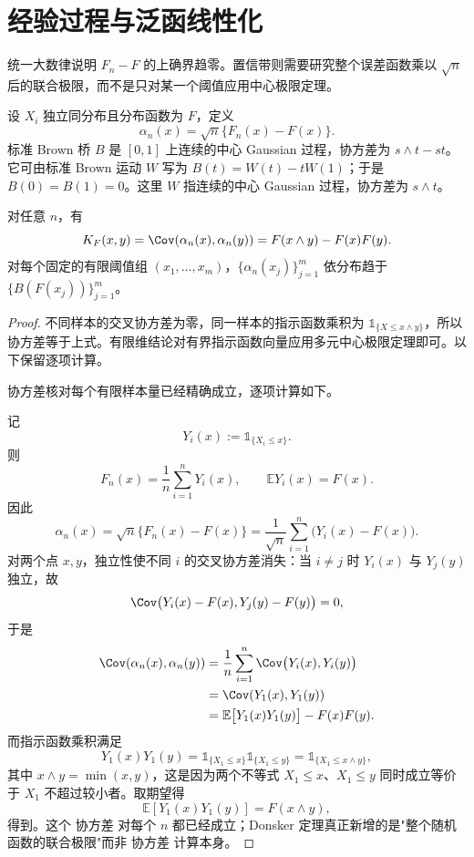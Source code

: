\section{经验过程与泛函线性化}

统一大数律说明 $F_n-F$ 的上确界趋零。置信带则需要研究整个误差函数乘以 $\sqrt n$ 后的联合极限，而不是只对某一个阈值应用中心极限定理。

\begin{definition}
设 $X_i$ 独立同分布且分布函数为 $F$，定义
\[
 \alpha_n(x)=\sqrt n\{F_n(x)-F(x)\}.
\]
标准 Brown 桥 $B$ 是 $[0,1]$ 上连续的中心 Gaussian 过程，协方差为 $s\wedge t-st$。它可由标准 Brown 运动 $W$ 写为 $B(t)=W(t)-tW(1)$；于是 $B(0)=B(1)=0$。这里 $W$ 指连续的中心 Gaussian 过程，协方差为 $s\wedge t$。
\end{definition}

\begin{proposition}[经验过程的精确协方差与有限维极限]
对任意 $n$，有
\begin{equation}\label{eq:math-stat-brownian-bridge-covariance}
 K_F(x,y)=\Cov(\alpha_n(x),\alpha_n(y))
 =F(x\wedge y)-F(x)F(y).
\end{equation}
对每个固定的有限阈值组 $(x_1,\ldots,x_m)$，$\{\alpha_n(x_j)\}_{j=1}^m$ 依分布趋于 $\{B(F(x_j))\}_{j=1}^m$。
\end{proposition}
\begin{proof}
不同样本的交叉协方差为零，同一样本的指示函数乘积为 $\mathds{1}_{\{X\le x\wedge y\}}$，所以协方差等于上式。有限维结论对有界指示函数向量应用多元中心极限定理即可。以下保留逐项计算。

协方差核对每个有限样本量已经精确成立，逐项计算如下。

记
\[
Y_i(x):=\mathds{1}_{\{X_i\le x\}}.
\]
则
\[
F_n(x)=\frac1n\sum_{i=1}^nY_i(x),
\qquad
\mathbb E Y_i(x)=F(x).
\]
因此
\[
\alpha_n(x)
=\sqrt n\{F_n(x)-F(x)\}
=\frac1{\sqrt n}\sum_{i=1}^n
\bigl(Y_i(x)-F(x)\bigr).
\]
对两个点 $x,y$，独立性使不同 $i$ 的交叉协方差消失：当 $i\neq j$ 时 $Y_i(x)$ 与 $Y_j(y)$ 独立，故
\[
\Cov\bigl(Y_i(x)-F(x),Y_j(y)-F(y)\bigr)=0,
\]
于是
\[
\begin{aligned}
\Cov(\alpha_n(x),\alpha_n(y))
&=\frac1n\sum_{i=1}^n\Cov\bigl(Y_i(x),Y_i(y)\bigr)\\
&=\Cov(Y_1(x),Y_1(y))\\
&=\mathbb E\bigl[Y_1(x)Y_1(y)\bigr]-F(x)F(y).
\end{aligned}
\]
而指示函数乘积满足
\[
Y_1(x)Y_1(y)
=\mathds{1}_{\{X_1\le x\}}\mathds{1}_{\{X_1\le y\}}
=\mathds{1}_{\{X_1\le x\wedge y\}},
\]
其中 $x\wedge y=\min(x,y)$，这是因为两个不等式 $X_1\le x$、$X_1\le y$ 同时成立等价于 $X_1$ 不超过较小者。取期望得
\[
\mathbb E[Y_1(x)Y_1(y)]
=F(x\wedge y),
\]
得到。这个 协方差 对每个 $n$ 都已经成立；Donsker 定理真正新增的是"整个随机函数的联合极限"而非 协方差 计算本身。
\end{proof}

